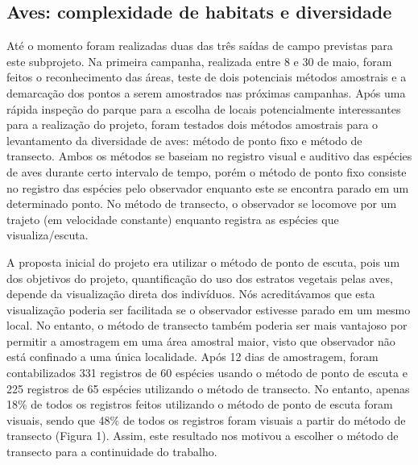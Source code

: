 \subsection{Aves: complexidade de habitats e diversidade} %
\label{sec:compl-de-habit} 


Até o momento foram realizadas duas das três saídas de campo previstas para este subprojeto. Na primeira campanha, realizada entre 8 e 30 de maio, foram feitos o reconhecimento das áreas, teste de dois potenciais métodos amostrais e a demarcação dos pontos a serem amostrados nas próximas campanhas. Após uma rápida inspeção do parque para a escolha de locais potencialmente interessantes para a realização do projeto, foram testados dois métodos amostrais para o levantamento da diversidade de aves: método de ponto fixo e método de transecto. Ambos os métodos se baseiam no registro visual e auditivo das espécies de aves durante certo intervalo de tempo, porém o método de ponto fixo consiste no registro das espécies pelo observador enquanto este se encontra parado em um determinado ponto. No método de transecto, o observador se locomove por um trajeto (em velocidade constante) enquanto registra as espécies que visualiza/escuta.

A proposta inicial do projeto era utilizar o método de ponto de escuta, pois um dos objetivos do projeto, quantificação do uso dos estratos vegetais pelas aves, depende da visualização direta dos indivíduos. Nós acreditávamos que esta visualização poderia ser facilitada se o observador estivesse parado em um mesmo local. No entanto, o método de transecto também poderia ser mais vantajoso por permitir a amostragem em uma área amostral maior, visto que observador não está confinado a uma única localidade. Após 12 dias de amostragem, foram contabilizados 331 registros de 60 espécies usando o método de ponto de escuta e 225 registros de 65 espécies utilizando o método de transecto. No entanto, apenas 18\% de todos os registros feitos utilizando o método de ponto de escuta foram visuais, sendo que 48\% de todos os registros foram visuais a partir do método de transecto (Figura 1).
Assim, este resultado nos motivou a escolher o método de transecto para a continuidade do trabalho.